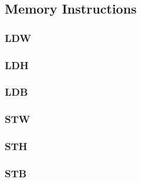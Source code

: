 \subsection{Memory Instructions}

\subsubsection{LDW }\label{sec:LDW}

\subsubsection{LDH }\label{sec:LDH}

\subsubsection{LDB }\label{sec:LDB}

\subsubsection{STW }\label{sec:STW}

\subsubsection{STH }\label{sec:STH}

\subsubsection{STB }\label{sec:STB}
